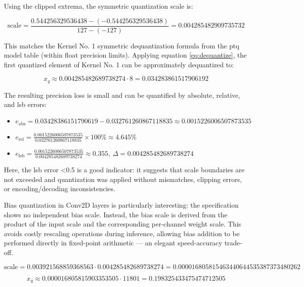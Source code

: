 {Using the clipped extrema, the symmetric quantization scale is:

\begin{equation*}
\text{scale} = \frac{0.544256329536438 - (-0.544256329536438)}{127 - (-127)} = 0.004285482909735732
\end{equation*}

This matches the Kernel No. 1 symmetric dequantization formula from the \gls{ptq} model table (within float precision limits).
Applying equation \ref{eq:dequantize}, the first quantized element of Kernel No. 1 can be approximately dequantized to:

\begin{equation*}
x_{q} \approx 0.004285482689738274 \cdot 8 = 0.034283861517906192
\end{equation*}

The resulting precision loss is small and can be quantified by absolute, relative, and \gls{lsb} errors:

\begin{itemize}
    \item $e_{\text{abs}} = 0.03428386151790619 - 0.032761260867118835 \approx 0.0015226006507873535$
    \item $e_{\text{rel}} = \frac{0.0015226006507873535}{0.032761260867118835} \times 100\% \approx 4.645\%$
    \item $e_{\text{lsb}} = \frac{0.0015226006507873535}{0.004285482689738274} \approx 0.355,\ \Delta = 0.004285482689738274$
\end{itemize}

Here, the \gls{lsb} error <0.5 is a good indicator: it suggests that scale boundaries are not exceeded and quantization was applied without mismatches, clipping errors, or encoding/decoding inconsistencies.

Bias quantization in Conv2D layers is particularly interesting: the specification shows no independent bias scale. Instead, the bias scale is derived from the product of the input scale and the corresponding per-channel weight scale. This avoids costly rescaling operations during inference, allowing bias addition to be performed directly in fixed-point arithmetic — an elegant speed-accuracy trade-off.

\begin{equation*}
\text{scale} = 0.003921568859368563 \cdot 0.004285482689738274 = 0.000016805815463440644535387373480262
\end{equation*}

\begin{equation*}
x_{q} \approx 0.000016805815903353505 \cdot 11801 = 0.198325433475474712505
\end{equation*}

}
